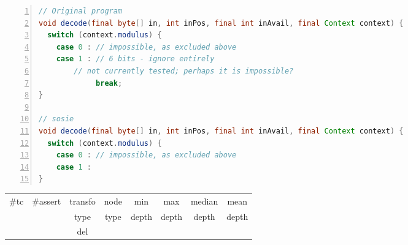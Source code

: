 \begin{minipage}{\columnwidth}
\begin{lstlisting}[caption={\texttt{decode} in commons.codec and a sosie},language=java,numbers=left]
// Original program
void decode(final byte[] in, int inPos, final int inAvail, final Context context) {
  switch (context.modulus) {
    case 0 : // impossible, as excluded above
    case 1 : // 6 bits - ignore entirely
        // not currently tested; perhaps it is impossible?
             break;
}

// sosie
void decode(final byte[] in, int inPos, final int inAvail, final Context context) {
  switch (context.modulus) {
    case 0 : // impossible, as excluded above
    case 1 : 
}
\end{lstlisting}
\tabcolsep=0.11cm
\begin{tabular}{>{\small}c>{\small}c>{\small}c>{\small}c>{\small}c>{\small}c>{\small}c>{\small}c}
\hline
\rowcolor{lightgray} \#tc & \#assert & transfo & node & min & max & median & mean   \\
\rowcolor{lightgray}  & & type & type & depth  & depth & depth & depth  \\ 
\hline
 &  & del &  &  &  &  & \\
\hline
\end{tabular}
\end{minipage}